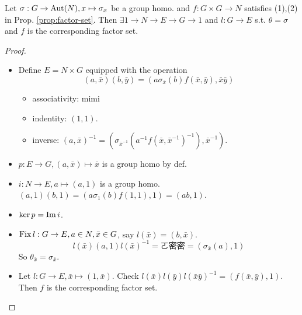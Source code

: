 \begin{theorem}
  Let $\sigma: G \to \operatorname{Aut}(N), x\mapsto \sigma_x$  be a group homo. and
  $f: G\times G\to N$ satisfies (1),(2) in Prop. \ref{prop:factor-set}.
  Then $\exists 1\to N\to E\to G\to 1$ and $l: G\to E$ s.t. $\theta = \sigma$
  and $f$ is the corresponding factor set.

  \begin{proof}
    \begin{itemize}
      \item Define $E = N \times G$ equipped with the operation
        \[
          (a, \bar{x})(b, \bar{y}) = (a \sigma_{\bar{x}}(b)f(\bar{x},\bar{y}),
          \bar{x}\bar{y})
        \]
        \begin{itemize}
          \item associativity: mimi
          \item indentity: $(1, 1)$.
          \item inverse: $(a, \bar{x})^{-1} =
            (\sigma_{\bar{x}^{-1}}(a^{-1}f(\bar{x},\bar{x}^{-1})^{-1}), \bar{x}^{-1})$.
        \end{itemize}
      \item $p: E\to G, (a, \bar{x}) \mapsto \bar{x}$ is a group homo by def.
      \item $i: N\to E, a \mapsto (a, 1)$ is a group homo.
        $(a, 1)(b, 1) = (a\sigma_1(b)f(1, 1), 1) = (ab, 1)$.
      \item $\ker p = \operatorname{Im} i$.
      \item $\operatorname{Fix} l: G\to E, a\in N, \bar{x}\in G$, say $l(\bar{x}) = (b, \bar{x})$.
        \[
          l(\bar{x})(a, 1)l(\bar{x})^{-1} = \text{ㄛ密密}
          = (\sigma_{\bar{x}}(a), 1)
        \]
        So $\theta_{\bar{x}} = \sigma_{\bar{x}}$.
      \item Let $l: G\to E, \bar{x}\mapsto (1, \bar{x})$.
        Check $l(\bar{x})l(\bar{y})l(\bar{x}\bar{y})^{-1} = (f(\bar{x},\bar{y}), 1)$.
        Then $f$ is the corresponding factor set.
        \qedhere
    \end{itemize}
  \end{proof}
\end{theorem}


